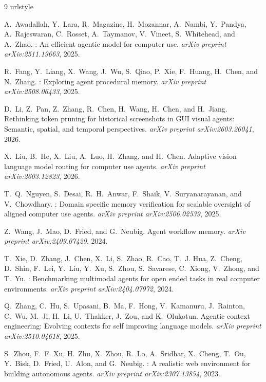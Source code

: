 \documentclass{article}
\theoremstyle{plain}
\theoremstyle{definition}
\theoremstyle{remark}
\begin{document}
\begin{thebibliography}{9}
\providecommand{\natexlab}[1]{#1}
\providecommand{\url}[1]{\texttt{#1}}
\expandafter\ifx\csname urlstyle\endcsname\relax
  \providecommand{\doi}[1]{doi: #1}\else
  \providecommand{\doi}{doi: \begingroup \urlstyle{rm}\Url}\fi

A.~Awadallah, Y.~Lara, R.~Magazine, H.~Mozannar, A.~Nambi, Y.~Pandya,
  A.~Rajeswaran, C.~Rosset, A.~Taymanov, V.~Vineet, S.~Whitehead, and A.~Zhao.
: An efficient agentic model for computer use.
\newblock \emph{arXiv preprint arXiv:2511.19663}, 2025.

R.~Fang, Y.~Liang, X.~Wang, J.~Wu, S.~Qiao, P.~Xie, F.~Huang, H.~Chen, and
  N.~Zhang.
: Exploring agent procedural memory.
\newblock \emph{arXiv preprint arXiv:2508.06433}, 2025.

D.~Li, Z.~Pan, Z.~Zhang, R.~Chen, H.~Wang, H.~Chen, and H.~Jiang.
\newblock Rethinking token pruning for historical screenshots in {GUI} visual
  agents: Semantic, spatial, and temporal perspectives.
\newblock \emph{arXiv preprint arXiv:2603.26041}, 2026.

X.~Liu, B.~He, X.~Liu, A.~Luo, H.~Zhang, and H.~Chen.
\newblock Adaptive vision language model routing for computer use agents.
\newblock \emph{arXiv preprint arXiv:2603.12823}, 2026.

T.~Q.~Nguyen, S.~Desai, R.~H.~Anwar, F.~Shaik, V.~Suryanarayanan, and
  V.~Chowdhary.
: Domain specific memory verification for scalable
  oversight of aligned computer use agents.
\newblock \emph{arXiv preprint arXiv:2506.02539}, 2025.

Z.~Wang, J.~Mao, D.~Fried, and G.~Neubig.
\newblock Agent workflow memory.
\newblock \emph{arXiv preprint arXiv:2409.07429}, 2024.

T.~Xie, D.~Zhang, J.~Chen, X.~Li, S.~Zhao, R.~Cao, T.~J. Hua, Z.~Cheng,
  D.~Shin, F.~Lei, Y.~Liu, Y.~Xu, S.~Zhou, S.~Savarese, C.~Xiong, V.~Zhong, and
  T.~Yu.
: Benchmarking multimodal agents for open ended tasks in
  real computer environments.
\newblock \emph{arXiv preprint arXiv:2404.07972}, 2024.

Q.~Zhang, C.~Hu, S.~Upasani, B.~Ma, F.~Hong, V.~Kamanuru, J.~Rainton, C.~Wu,
  M.~Ji, H.~Li, U.~Thakker, J.~Zou, and K.~Olukotun.
\newblock Agentic context engineering: Evolving contexts for self improving
  language models.
\newblock \emph{arXiv preprint arXiv:2510.04618}, 2025.

S.~Zhou, F.~F. Xu, H.~Zhu, X.~Zhou, R.~Lo, A.~Sridhar, X.~Cheng, T.~Ou,
  Y.~Bisk, D.~Fried, U.~Alon, and G.~Neubig.
: A realistic web environment for building autonomous
  agents.
\newblock \emph{arXiv preprint arXiv:2307.13854}, 2023.

\end{thebibliography}
\end{document}
